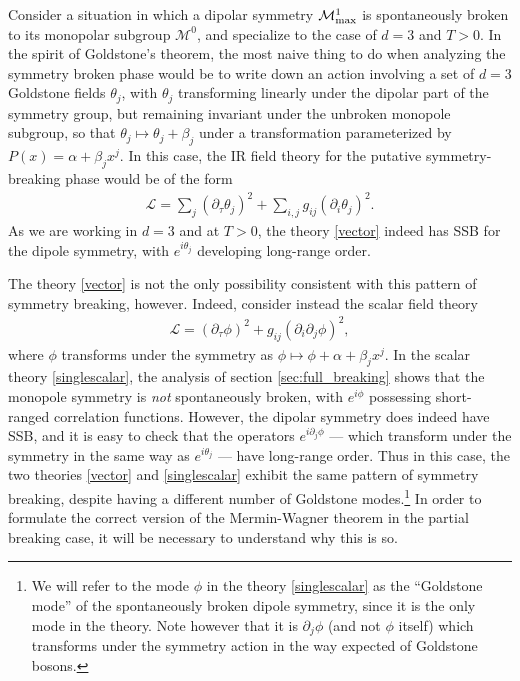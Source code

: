 \documentclass[pra,aps,twocolumn, amsfonts,amsmath,amssymb,nofootinbib,superscriptaddress]{revtex4-2}
\newcommand{\p}{\partial}
\renewcommand{\t}{\theta}
\newcommand{\mcm}{\mathcal{M}}
\begin{document}
Consider a situation in which a dipolar symmetry $\mcm^1_{\rm max}$ is spontaneously broken to its monopolar subgroup $\mcm^0$, and specialize to the case of $d=3$ and $T>0$. In the spirit of Goldstone's theorem, the most naive thing to do when analyzing the symmetry broken phase would be to write down an action involving a set of $d=3$ Goldstone fields $\theta_j$, with $\t_j$ transforming linearly under the dipolar part of the symmetry group, but remaining invariant under the unbroken monopole subgroup, so that $\theta_j \mapsto \theta_j + \beta_j$ under a transformation parameterized by $P(x) = \alpha + \beta_j x^j$. In this case, the IR field theory for the putative symmetry-breaking phase would be of the form 
\begin{align}
\label{vector} \mathcal{L}= \sum_j  (\partial_\tau \theta_j)^2 + \sum_{i,j} g_{ij} (\partial_i \theta_j)^2.
\end{align}
As we are working in $d=3$ and at $T>0$, the theory \eqref{vector} indeed has SSB for the dipole symmetry, with $e^{i\t_j}$ developing long-range order. 

The theory \eqref{vector} is not the only possibility consistent with this pattern of symmetry breaking, however. Indeed, consider instead the scalar field theory 
\begin{align}
\label{singlescalar}    \mathcal{L} = (\partial_\tau\phi)^2 + g_{ij} (\partial_i\partial_j\phi)^2, \end{align}
where $\phi$ transforms under the symmetry as $\phi \mapsto \phi + \alpha + \beta_jx^j$. 
 In the scalar theory \eqref{singlescalar}, the analysis of section \ref{sec:full_breaking} shows that the monopole symmetry is {\it not} spontaneously broken, with $e^{i\phi}$ possessing short-ranged correlation functions. However, the dipolar symmetry does indeed have SSB, and it is easy to check that the operators $e^{i\p_j\phi}$ --- which transform under the symmetry in the same way as $e^{i\t_j}$ --- have long-range order. Thus in this case, the two theories \eqref{vector} and \eqref{singlescalar} exhibit the same pattern of symmetry breaking, despite having a different number of Goldstone modes.\footnote{We will refer to the mode $\phi$ in the theory \eqref{singlescalar} as the ``Goldstone mode'' of the spontaneously broken dipole symmetry, since it is the only mode in the theory. Note however that it is $\p_j\phi$ (and not $\phi$ itself) which transforms under the symmetry action in the way expected of Goldstone bosons.} In order to formulate the correct version of the Mermin-Wagner theorem in the partial breaking case, it will be necessary to understand why this is so.  
\end{document}
